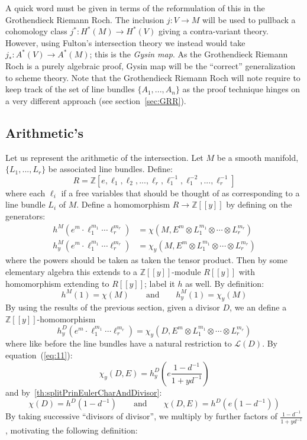 \documentclass{book}
\newcommand{\Z}{{\mathbb{Z}}}
\newcommand{\CL}{{\mathcal{L}}}
\begin{document}
A quick word must be given in terms of the reformulation of this in the Grothendieck Riemann Roch. The
inclusion $j: V \to M$ will be used to pullback a cohomology class $j^*: H^*(M) \to H^*(V)$ giving
a contra-variant theory. However, using Fulton's intersection theory we instead would take $j_*: A^*(V) \to
A^*(M)$; this is the \emph{Gysin map}. As the Grothendieck Riemann Roch is a purely algebraic proof, Gysin map
will be the ``correct'' generalization to scheme theory. Note that the Grothendieck Riemann Roch will note
require to keep track of the set of line bundles $\{A_1, ..., A_n\}$ as the proof technique hinges on
a very different approach (see section~\ref{sec:GRR}).

%

\subsection{Arithmetic's}

Let us represent the arithmetic of the intersection. Let $M$ be a smooth manifold, $\{L_1, ..., L_r\}$ be
associated line bundles. Define:
\[
  R = \Z[e, \ell_1, \ell_2, ..., \ell_r, \ell_1^{-1}, \ell_1^{-2}, ...,\ell_r^{-1}]
\]
where each $\ell_i$ if a free variables that should be thought of as  corresponding to a line bundle $L_i$ of
$M$. Define a homomorphism $R \to \Z[[y]]$ by defining on the generators:
\begin{align*}
  h^M(e^{m}\cdot \ell_1^{m_1}\cdots \ell_r^{m_r}) &= \chi(M, E^{m} \otimes L_1^{m_1}\otimes \cdots \otimes L_r^{m_r})\\
  h_y^M(e^{m}\cdot \ell_1^{m_1}\cdots \ell_r^{m_r}) &= \chi_y(M, E^{m} \otimes L_1^{m_1}\otimes \cdots \otimes L_r^{m_r})
\end{align*}
where the powers should be taken as taken the tensor product. Then by some elementary algebra this extends to
a $\Z[[y]]$-module $R[[y]]$ with homomorphism extending to $R[[y]]$; label it $h$ as well. By definition:
\[
  h^M(1) = \chi(M) \qquad \text{and} \qquad h_y^M(1) = \chi_y(M)
\]
By using the results of the previous section, given a divisor $D$, we an define a $\Z[[y]]$-homomorphism
\[
  h_y^D(e^{m}\cdot \ell_1^{m_1}\cdots \ell_r^{m_r}) = \chi_y(D, E^{m} \otimes L_1^{m_1}\otimes \cdots \otimes
  L_r^{m_r})
\]
where like before the line bundles have a natural restriction to $\CL(D)$. By equation~(\ref{eq:11}):
\[
  \chi_y(D, E) = h_y^D \left(e\frac{1-d^{-1}}{1+yd^{-1}}\right)
\]
and by~\cref{th:splitPrinEulerCharAndDivisor}:
\[
  \chi(D) = h^D(1-d^{-1}) \qquad \text{and} \qquad \chi(D, E) = h^D(e(1- d^{-1}))
\]
By taking successive ``divisors of divisor'', we multiply by further factors of $\frac{1-d^{-1}}{1+yd^{-1}}$,
motivating the following definition:
\end{document}
